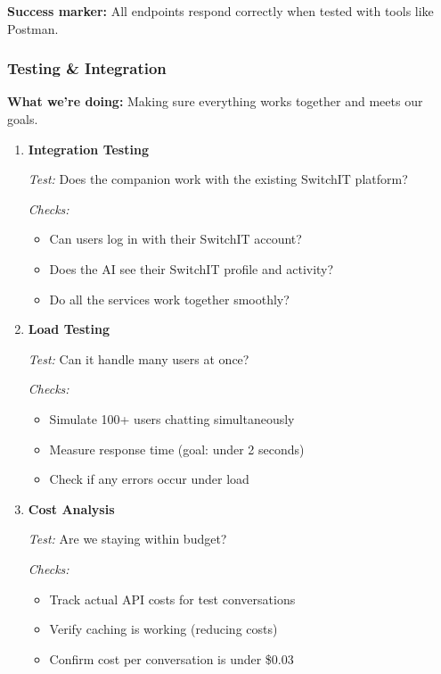 \documentclass[12pt,a4paper]{article}
\begin{document}
\textbf{Success marker:} All endpoints respond correctly when tested with tools like Postman.

\subsubsection{Testing \& Integration }

\textbf{What we're doing:} Making sure everything works together and meets our goals.

\begin{enumerate}
  \item \textbf{Integration Testing }

  \textit{Test:} Does the companion work with the existing SwitchIT platform?

  \textit{Checks:}
  \begin{itemize}
    \item Can users log in with their SwitchIT account?
    \item Does the AI see their SwitchIT profile and activity?
    \item Do all the services work together smoothly?
  \end{itemize}

  \item \textbf{Load Testing }

  \textit{Test:} Can it handle many users at once?

  \textit{Checks:}
  \begin{itemize}
    \item Simulate 100+ users chatting simultaneously
    \item Measure response time (goal: under 2 seconds)
    \item Check if any errors occur under load
  \end{itemize}

  \item \textbf{Cost Analysis }

  \textit{Test:} Are we staying within budget?

  \textit{Checks:}
  \begin{itemize}
    \item Track actual API costs for test conversations
    \item Verify caching is working (reducing costs)
    \item Confirm cost per conversation is under \$0.03
  \end{itemize}
\end{enumerate}
\end{document}
